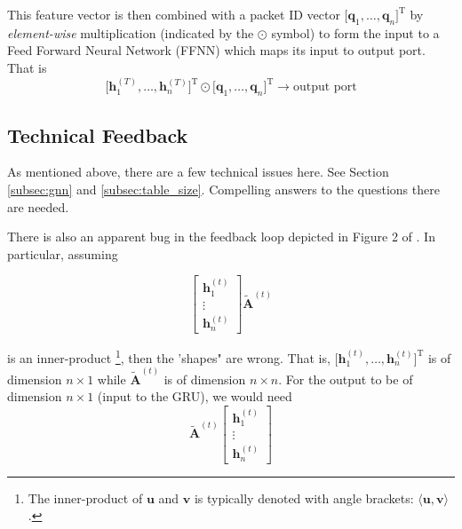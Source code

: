 \documentclass[11pt, oneside]{article}   	%
\begin{document}
\bigskip
\noindent
This feature vector is then combined with a packet ID vector $\big [ \mathbf{q}_1,\hdots, \mathbf{q}_n \big ]^\text{T}$ by \emph{element-wise} multiplication (indicated by the
$\odot$ symbol) to form the input to a Feed Forward Neural Network (FFNN) which maps its input to output port. That is
\begin{equation*}
\big [ \mathbf{h}^{(T)}_1,\hdots, \mathbf{h}^{(T)}_n \Big ]^\text{T} \odot \big [ \mathbf{q}_1,\hdots, \mathbf{q}_n \big ]^\text{T} \to \text{output port}
\end{equation*}

\subsection{Technical Feedback}
\label{slide5:technical_feedback}
As mentioned above, there are a few technical issues here. See Section \ref{subsec:gnn} and \ref{subsec:table_size}. Compelling answers to the questions
there are needed.

\bigskip
\noindent
There is also an apparent bug in the feedback loop depicted in Figure 2 of \cite{DBLP:conf/sigcomm/GeyerC18}. In particular, assuming

\begin{equation*}
\begin{bmatrix}
           \textbf{h}_{1}^{(t)} \\
           \vdots \\
           \textbf{h}_{n}^{(t)}
         \end{bmatrix}
         \widetilde{\textbf{A}}^{(t)}
\end{equation*}

\bigskip
\noindent
is an inner-product \footnote{The inner-product of $\textbf{u}$ and $\textbf{v}$ is typically denoted with angle brackets: $\langle \textbf{u}, \textbf{v} \rangle$.}, then the 'shapes" are wrong. 
That is, $ \big [ \textbf{h}_{1}^{(t)}, \hdots,  \textbf{h}_{n}^{(t)} \big ]^{\text{T}}$ is of dimension $n \times 1$ while $\widetilde{\textbf{A}}^{(t)}$
is of dimension $n \times n$. For the output to be of dimension $n \times 1$ (input to the GRU), we would need 
\begin{equation*}
\widetilde{\textbf{A}}^{(t)}
\begin{bmatrix}
           \textbf{h}_{1}^{(t)} \\
           \vdots \\
           \textbf{h}_{n}^{(t)}
         \end{bmatrix}
\end{equation*}
\end{document}
